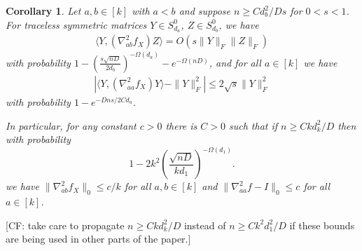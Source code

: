 \documentclass[aos]{imsart}
\newtheorem{corollary}[theorem]{Corollary}
\theoremstyle{definition}
\newcommand{\smallSym}{S}
\newcommand{\samp}{x}
\newcommand{\rv}{X}
\newcommand{\CF}[1]{{\color{purple}[CF: #1]}}
\newcommand{\AR}[1]{{\color{orange}[AR: #1]}}
\newcommand{\TODO}[1]{{\color{blue}[TODO: #1]}}
\begin{document}


\begin{corollary}\label{cor:off-diag-hess} Let $a,b \in [k]$ with $a < b$ and suppose $n \geq C d_b^2/Ds$ for $0 < s < 1$. For traceless symmetric matrices $Y \in \smallSym^0_{d_a}$, $Z \in \smallSym^0_{d_b}$, we have
\begin{align}\langle Y,  \left( \nabla^2_{ab} f_{\rv} \right) Z \rangle
= O \left(s \|Y\|_F\|Z\|_F\right)\label{eq:off-diag-hess}
\end{align}
with probability %
$1 - \left(\frac {s \sqrt{nD}}{2d_b}\right)^{ - \Omega(d_a)} - e^{- \Omega(nD)}$, and for all $a \in [k]$ we have
\begin{align} |\langle Y,  \left( \nabla^2_{aa} f_{\rv} \right) Y \rangle - \|Y\|_F^2|
\leq 2\sqrt{s} \|Y\|_F^2 \label{eq:diag-hess}
\end{align}
with probability $1 - e^{-D n s/2Cd_a}$.



In particular, for any constant $c>0$ there is $C>0$ such that if $n \geq C k d_k^2/D$ then with probability 
$$1 - 2k^2 \left(\frac {\sqrt{nD}}{kd_1}\right)^{ - \Omega(d_1)}.$$ we have $\|\nabla^2_{ab} f_{\rv}\|_0 \leq c/k$ for all $a,b \in [k]$ and $\|\nabla^2_{aa}f - I\|_0 \leq c$ for all $a \in [k]$.


\end{corollary}
\CF{take care to propagate $n \geq C k d_k^2/D$ instead of $n \geq C k^2 d_1^2/D$ if these bounds are being used in other parts of the paper.}
\end{document}
